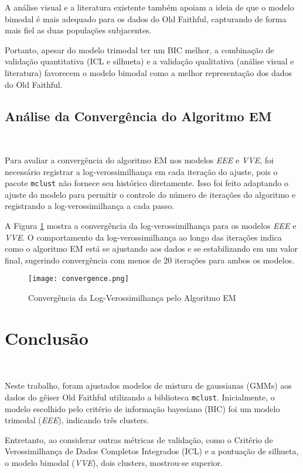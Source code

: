 \documentclass[12pt]{article}
\begin{document}
A análise visual e a literatura existente também apoiam a ideia de que o modelo bimodal é mais adequado para os dados do Old Faithful, capturando de forma mais fiel as duas populações subjacentes.

Portanto, apesar do modelo trimodal ter um BIC melhor, a combinação de validação quantitativa (ICL e silhueta) e a validação qualitativa (análise visual e literatura) favorecem o modelo bimodal como a melhor representação dos dados do Old Faithful.


\subsection{Análise da Convergência do Algoritmo EM}

\

Para avaliar a convergência do algoritmo EM nos modelos \textit{EEE} e \textit{VVE}, foi necessário registrar a log-verossimilhança em cada iteração do ajuste, pois o pacote \texttt{mclust} não fornece seu histórico diretamente. Isso foi feito adaptando o ajuste do modelo para permitir o controle do número de iterações do algoritmo e registrando a log-verossimilhança a cada passo.

A Figura \ref{convergencia} mostra a convergência da log-verossimilhança para os modelos \textit{EEE} e \textit{VVE}. O comportamento da log-verossimilhança ao longo das iterações indica como o algoritmo EM está se ajustando aos dados e se estabilizando em um valor final, sugerindo convergência com menos de 20 iterações para ambos os modelos.

\begin{figure}[H]
\centering
\caption{Convergência da Log-Verossimilhança pelo Algoritmo EM}\label{convergencia}
\texttt{[image: convergence.png]}
\end{figure}

\section{Conclusão}

\

Neste trabalho, foram ajustados modelos de mistura de gaussianas (GMMs) aos dados do gêiser Old Faithful utilizando a biblioteca \texttt{mclust}. Inicialmente, o modelo escolhido pelo critério de informação bayesiano (BIC) foi um modelo trimodal (\textit{EEE}), indicando três clusters.

Entretanto, ao considerar outras métricas de validação, como o Critério de Verossimilhança de Dados Completos Integrados (ICL) e a pontuação de silhueta, o modelo bimodal (\textit{VVE}), dois clusters, mostrou-se superior.
\end{document}

